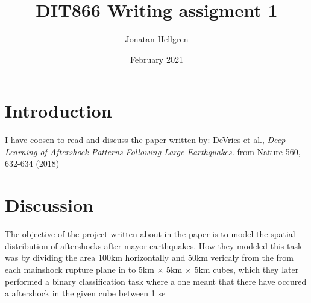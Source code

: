 \documentclass{article}
\title{DIT866 Writing assigment 1}
\author{Jonatan Hellgren }
\date{February 2021}
\begin{document}
\maketitle

\section{Introduction}
I have coosen to read and discuss the paper written by: DeVries et al.,
\textit{Deep Learning of Aftershock Patterns Following Large Earthquakes.} from
Nature 560, 632-634 (2018)

\section{Discussion}
The objective of the project written about in the paper is to model the spatial
distribution of aftershocks after mayor earthquakes. How they modeled this task
was by dividing the area 100km horizontally and 50km vericaly from the from each
mainshock rupture plane in to 5km $\times$ 5km $\times$ 5km cubes, which they
later performed a binary classification task where a one meant that there have
occured a aftershock in the given cube between 1 se
\end{document}
